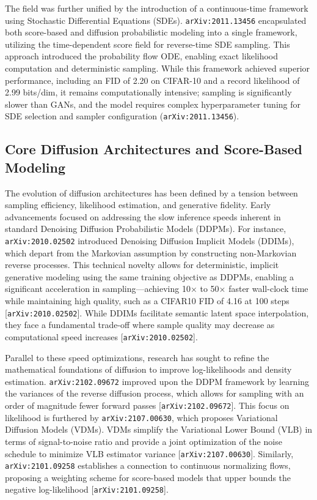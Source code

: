 \documentclass[11pt]{article}
\begin{document}
The field was further unified by the introduction of a continuous-time framework using Stochastic Differential Equations (SDEs). \texttt{arXiv:2011.13456} encapsulated both score-based and diffusion probabilistic modeling into a single framework, utilizing the time-dependent score field for reverse-time SDE sampling. This approach introduced the probability flow ODE, enabling exact likelihood computation and deterministic sampling. While this framework achieved superior performance, including an FID of 2.20 on CIFAR-10 and a record likelihood of 2.99 bits/dim, it remains computationally intensive; sampling is significantly slower than GANs, and the model requires complex hyperparameter tuning for SDE selection and sampler configuration (\texttt{arXiv:2011.13456}).

\subsection{Core Diffusion Architectures and Score-Based Modeling}

The evolution of diffusion architectures has been defined by a tension between sampling efficiency, likelihood estimation, and generative fidelity. Early advancements focused on addressing the slow inference speeds inherent in standard Denoising Diffusion Probabilistic Models (DDPMs). For instance, \texttt{arXiv:2010.02502} introduced Denoising Diffusion Implicit Models (DDIMs), which depart from the Markovian assumption by constructing non-Markovian reverse processes. This technical novelty allows for deterministic, implicit generative modeling using the same training objective as DDPMs, enabling a significant acceleration in sampling—achieving 10× to 50× faster wall-clock time while maintaining high quality, such as a CIFAR10 FID of 4.16 at 100 steps [\texttt{arXiv:2010.02502}]. While DDIMs facilitate semantic latent space interpolation, they face a fundamental trade-off where sample quality may decrease as computational speed increases [\texttt{arXiv:2010.02502}].

Parallel to these speed optimizations, research has sought to refine the mathematical foundations of diffusion to improve log-likelihoods and density estimation. \texttt{arXiv:2102.09672} improved upon the DDPM framework by learning the variances of the reverse diffusion process, which allows for sampling with an order of magnitude fewer forward passes [\texttt{arXiv:2102.09672}]. This focus on likelihood is furthered by \texttt{arXiv:2107.00630}, which proposes Variational Diffusion Models (VDMs). VDMs simplify the Variational Lower Bound (VLB) in terms of signal-to-noise ratio and provide a joint optimization of the noise schedule to minimize VLB estimator variance [\texttt{arXiv:2107.00630}]. Similarly, \texttt{arXiv:2101.09258} establishes a connection to continuous normalizing flows, proposing a weighting scheme for score-based models that upper bounds the negative log-likelihood [\texttt{arXiv:2101.09258}].
\end{document}
